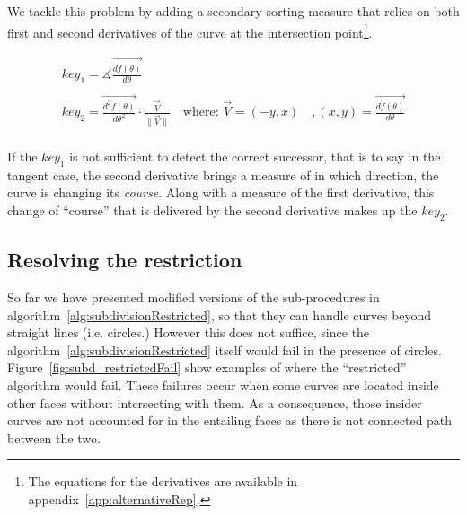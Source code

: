 We tackle this problem by adding a secondary sorting measure that relies on both first and second derivatives of the curve at the intersection point\footnote{The equations for the derivatives are available in appendix~\ref{app:alternativeRep}.}.

\[
\begin{array}{l}
  key_1 = \measuredangle \overrightarrow{\frac{d\dot{f}(\theta)}{d\theta}}\\
  \quad\\
  key_2 = \overrightarrow{\frac{d^2\dot{f}(\theta)}{d\theta^2}} \cdot \frac{\overrightarrow{V}}{\|\overrightarrow{V}\|} \quad \text{where: } \overrightarrow{V} = (-y,x) \quad , (x,y) = \overrightarrow{\frac{d\dot{f}(\theta)}{d\theta}}\\
\end{array}
\]

If the $key_1$ is not sufficient to detect the correct successor, that is to say in the tangent case,
the second derivative brings a measure of in which direction, the curve is changing its \emph{course}.
Along with a measure of the first derivative, this change of ``course'' that is delivered by the second derivative makes up the $key_2$.

\subsection{Resolving the restriction} \label{subsec:}

So far we have presented modified versions of the sub-procedures in algorithm~\ref{alg:subdivisionRestricted}, so that they can handle curves beyond straight lines (i.e. circles.)
However this does not suffice, since the algorithm~\ref{alg:subdivisionRestricted} itself would fail in the presence of circles.
Figure~\ref{fig:subd_restrictedFail} show examples of where the ``restricted'' algorithm would fail.
These failures occur when some curves are located inside other faces without intersecting with them.
As a consequence, those insider curves are not accounted for in the entailing faces as there is not connected path between the two.

